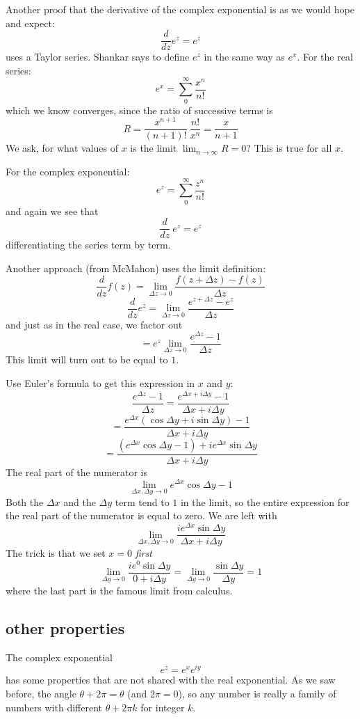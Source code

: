 \documentclass[11pt, oneside]{article}   	%
\begin{document}
Another proof that the derivative of the complex exponential is as we would hope and expect:
\[ \frac{d}{dz} e^z = e^z \]
uses a Taylor series.  Shankar says to define $e^z$ in the same way as $e^x$.  For the real series:
\[ e^x = \sum_0^{\infty} \frac{x^n}{n!} \]
which we know converges, since the ratio of successive terms is
\[ R = \frac{x^{n+1}}{(n+1)!} \ \frac{n!}{x^n} = \frac{x}{n+1} \]
We ask, for what values of $x$ is the limit $\lim_{n \rightarrow \infty} R = 0$?  This is true for all $x$.

For the complex exponential:
\[ e^z = \sum_0^{\infty} \frac{z^n}{n!} \]
and again we see that 
\[ \frac{d}{dz} \ e^z = e^z \]
differentiating the series term by term.

Another approach (from McMahon) uses the limit definition:
\[ \frac{d}{dz} f(z) = \lim_{\Delta z \rightarrow 0} \frac{f(z + \Delta z) - f(z)}{\Delta z} \]
\[ \frac{d}{dz} e^z =  \lim_{\Delta z \rightarrow 0}  \frac{e^{z + \Delta z} - e^z}{\Delta z} \]
and just as in the real case, we factor out 
\[ =  e^z \lim_{\Delta z \rightarrow 0}  \frac{e^{\Delta z} - 1}{\Delta z} \]
This limit will turn out to be equal to $1$.  

Use Euler's formula to get this expression in $x$ and $y$:
\[ \frac{e^{\Delta z} - 1}{\Delta z} =  \frac{e^{\Delta x + i \Delta y} - 1}{\Delta x + i \Delta y} \]
\[ = \frac{e^{\Delta x} (\cos \Delta y + i \sin \Delta y) - 1}{\Delta x + i \Delta y} \]
\[ = \frac{(e^{\Delta x} \cos \Delta y - 1) + i  e^{\Delta x} \sin \Delta y}{\Delta x + i \Delta y} \]
The real part of the numerator is
\[ \lim_{\Delta x, \Delta y \rightarrow 0} e^{\Delta x} \cos \Delta y - 1 \]
Both the $\Delta x$ and the $\Delta y$ term tend to $1$ in the limit, so the entire expression for the real part of the numerator is equal to zero.  We are left with
\[ \lim_{\Delta x, \Delta y \rightarrow 0}  \frac{i  e^{\Delta x} \sin \Delta y}{\Delta x + i \Delta y} \]
The trick is that we set $x = 0$ \emph{first}
\[ \lim_{\Delta y \rightarrow 0}  \frac{i  e^0 \sin \Delta y}{0 + i \Delta y} = \lim_{\Delta y \rightarrow 0}  \frac{\sin \Delta y}{\Delta y} = 1 \]
where the last part is the famous limit from calculus.

\subsection*{other properties}

The complex exponential 
\[ e^z = e^x e^{iy} \]
has some properties that are not shared with the real exponential.  As we saw before, the angle $\theta + 2 \pi = \theta$ (and $2 \pi = 0$), so any number is really a family of numbers with different $\theta + 2 \pi k$ for integer $k$.
\end{document}
